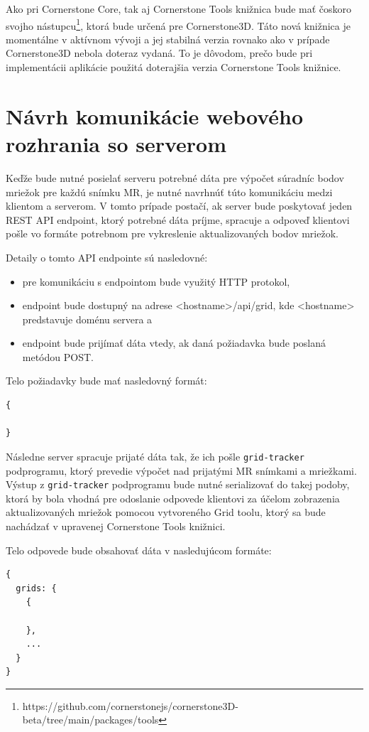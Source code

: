 Ako pri Cornerstone Core, tak aj Cornerstone Tools knižnica bude mať čoskoro svojho nástupcu\footnote{https://github.com/cornerstonejs/cornerstone3D-beta/tree/main/packages/tools}, ktorá bude určená pre Cornerstone3D. Táto nová knižnica je momentálne v aktívnom vývoji a jej stabilná verzia rovnako ako v prípade Cornerstone3D nebola doteraz vydaná. To je dôvodom, prečo bude pri implementácii aplikácie použitá doterajšia verzia Cornerstone Tools knižnice.

\section {Návrh komunikácie webového rozhrania so serverom}\label{api_endpoint}
Keďže bude nutné posielať serveru potrebné dáta pre výpočet súradníc bodov mriežok pre každú snímku MR, je nutné navrhnúť túto komunikáciu medzi klientom a serverom. V tomto prípade postačí, ak server bude poskytovať jeden REST API endpoint, ktorý potrebné dáta príjme, spracuje a odpoveď klientovi pošle vo formáte potrebnom pre vykreslenie aktualizovaných bodov mriežok.

Detaily o tomto API endpointe sú nasledovné:
\begin {itemize}
\item {pre komunikáciu s endpointom bude využitý HTTP protokol,}
\item {endpoint bude dostupný na adrese <hostname>/api/grid, kde <hostname> predstavuje doménu servera a}
\item {endpoint bude prijímať dáta vtedy, ak daná požiadavka bude poslaná metódou POST.}
\end {itemize}

Telo požiadavky bude mať nasledovný formát:
\begin{verbatim}
{

}
\end{verbatim}

Následne server spracuje prijaté dáta tak, že ich pošle \texttt{grid-tracker} podprogramu, ktorý prevedie výpočet nad prijatými MR snímkami a mriežkami. Výstup z \texttt{grid-tracker} podprogramu bude nutné serializovať do takej podoby, ktorá by bola vhodná pre odoslanie odpovede klientovi za účelom zobrazenia aktualizovaných mriežok pomocou vytvoreného Grid toolu, ktorý sa bude nachádzať v upravenej Cornerstone Tools knižnici.

Telo odpovede bude obsahovať dáta v nasledujúcom formáte:
\begin{verbatim}
{
  grids: {
    {
      
    },
    ...
  }
}
\end{verbatim}


